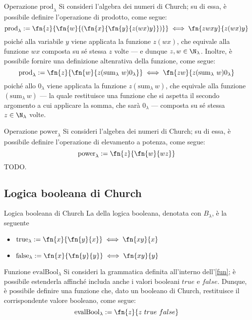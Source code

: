 \documentclass[a4paper, 12pt]{report}
\begin{document}
    \begin{framedprop}{Operazione $\mathrm{prod}_\lambda$}
        Si consideri l'algebra dei numeri di Church; su di essa, è possibile definire l'operazione di prodotto, come segue: $$\mathrm{prod}_\lambda := \fn{z}{\fn{w}{(\fn{x}{\fn{y}{z(wx)y}})}} \iff \fn{zwxy}{z(wx)y}$$ poiché alla variabile $y$ viene applicata la funzione $z(wx)$, che equivale alla funzione $wx$ composta su sé stessa $z$ volte --- e dunque $z, w \in \N_\lambda$. Inoltre, è possibile fornire una definizione altenrativa della funzione, come segue: $$\mathrm{prod}_\lambda := \fn{z}{\fn{w}{z (\mathrm{sum}_\lambda \ w)0_\lambda}} \iff \fn{zw}{z(\mathrm{sum}_\lambda \ w)0_\lambda}$$ poiché allo $0_\lambda$ viene applicata la funzione $z(\mathrm{sum}_\lambda \ w)$, che equivale alla funzione $(\mathrm{sum}_\lambda \ w)$ --- la quale restituisce una funzione che si aspetta il secondo argomento a cui applicare la somma, che sarà $0_\lambda$ --- composta su sé stessa $z \in \N_\lambda$ volte.
    \end{framedprop}

    \begin{framedprop}{Operazione $\mathrm{power}_\lambda$}
        Si consideri l'algebra dei numeri di Church; su di essa, è possibile definire l'operazione di elevamento a potenza, come segue: $$\mathrm{power}_\lambda := \fn{z}{\fn{w}{wz}}$$ TODO.
    \end{framedprop}

    \subsection{Logica booleana di Church}

    \begin{frameddefn}{Logica booleana di Church}
        La  della logica booleana, denotata con $B_\lambda$, è la seguente

        \begin{itemize}
            \item $\mathrm{true}_\lambda := \fn{x}{\fn{y}{x}} \iff \fn{xy}{x}$
            \item $\mathrm{false}_\lambda := \fn{x}{\fn{y}{y}} \iff \fn{xy}{y}$
        \end{itemize}
    \end{frameddefn}

    \begin{framedprop}{Funzione $\mathrm{evalBool}_\lambda$}
        Si consideri la grammatica definita all'interno dell'\cref{fun}; è possibile estenderla affinché includa anche i valori booleani $true$ e $false$. Dunque, è possibile definire una funzione che, dato un booleano di Church, restituisce il corrispondente valore booleano, come segue: $$\mathrm{evalBool}_\lambda := \fn{z}{z \ true \ false}$$
    \end{framedprop}
\end{document}
